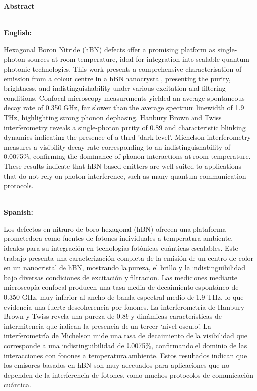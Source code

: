 \begin{center}
    \Large{\textbf{Abstract}} \\
\end{center}
~\\[0.5 cm]

\textbf{English:}

Hexagonal Boron Nitride (hBN) defects offer a promising platform as single-photon sources at room temperature, ideal for integration into scalable quantum photonic technologies. This work presents a comprehensive characterisation of emission from a colour centre in a hBN nanocrystal, presenting the purity, brightness, and indistinguishability under various excitation and filtering conditions. Confocal microscopy measurements yielded an average spontaneous decay rate of 0.350 GHz, far slower than the average spectrum linewidth of 1.9 THz, highlighting strong phonon dephasing. Hanbury Brown and Twiss interferometry reveals a single-photon purity of 0.89 and characteristic blinking dynamics indicating the presence of a third 'dark-level'. Michelson interferometry measures a visibility decay rate corresponding to an indistinguishability of 0.0075\%, confirming the dominance of phonon interactions at room temperature. These results indicate that hBN-based emitters are well suited to applications that do not rely on photon interference, such as many quantum communication protocols.

~\\[2cm]

\textbf{Spanish:}

Los defectos en nitruro de boro hexagonal (hBN) ofrecen una plataforma prometedora como fuentes de fotones individuales a temperatura ambiente, ideales para su integración en tecnologías fotónicas cuánticas escalables. Este trabajo presenta una caracterización completa de la emisión de un centro de color en un nanocristal de hBN, mostrando la pureza, el brillo y la indistinguibilidad bajo diversas condiciones de excitación y filtracion. Las mediciones mediante microscopía confocal producen una tasa media de decaimiento espontáneo de 0.350 GHz, muy inferior al ancho de banda espectral medio de 1.9 THz, lo que evidencia una fuerte descoherencia por fonones. La interferometría de Hanbury Brown y Twiss revela una pureza de 0.89 y dinámicas características de intermitencia que indican la presencia de un tercer `nivel oscuro'. La interferometría de Michelson mide una tasa de decaimiento de la visibilidad que corresponde a una indistinguibilidad de 0.0075\%, confirmando el dominio de las interacciones con fonones a temperatura ambiente. Estos resultados indican que los emisores basados en hBN son muy adecuados para aplicaciones que no dependen de la interferencia de fotones, como muchos protocolos de comunicación cuántica.

\newpage